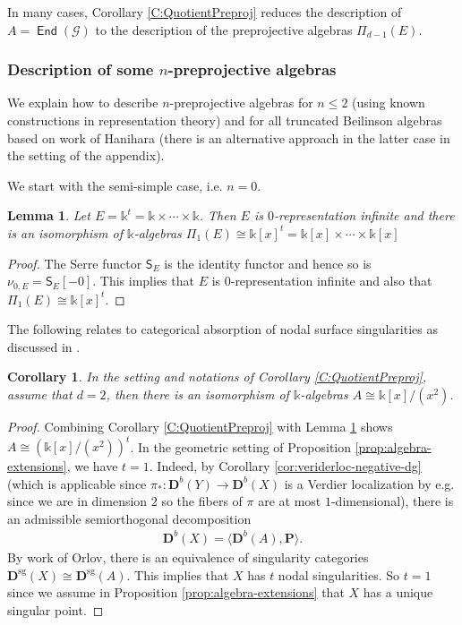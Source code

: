 \documentclass[a4paper,11pt, reqno]{amsart}
\def\DD{\mathbf D}
\def\PP{\mathbf P}
\def\sG{\mathscr{G}}
\newcommand{\opname}[1]{\operatorname{\mathsf{#1}}}
\newcommand{\End}{\opname{End}}
\def\Dsg{\DD^{\mathrm{sg}}}
\def\Db{\DD^b}
\theoremstyle{plain}
\newtheorem{lemma}[dummy]{Lemma}
\newtheorem{corollary}[dummy]{Corollary}
\theoremstyle{definition}
\numberwithin{equation}{section}
\begin{document}
In many cases, Corollary \ref{C:QuotientPreproj} reduces the description of $A=\End(\sG)$ to the description of the preprojective algebras $\Pi_{d-1}(E)$.

\subsubsection{Description of some $n$-preprojective algebras}

We explain how to describe $n$-preprojective algebras for $n\leq 2$ (using known constructions in representation theory) and for all truncated Beilinson algebras based on work of Hanihara \cite{Hanihara2} (there is an alternative approach in the latter case in the setting of the appendix).

We start with the semi-simple case, i.e. $n=0$.

\begin{lemma}\label{L:preprojn0}
    Let $E=\mathbb{k}^t=\mathbb{k} \times \cdots \times \mathbb{k}$. Then $E$ is $0$-representation infinite and there is an isomorphism of $\mathbb k$-algebras $\Pi_1(E) \cong \mathbb{k}[x]^t = \mathbb{k}[x] \times \cdots \times \mathbb{k}[x]$
    
\end{lemma}
\begin{proof}
    The Serre functor $\mathsf{S}_E$ is the identity functor and hence so is $\nu_{0,E}=\mathsf{S}_E[-0]$. This implies that $E$ is $0$-representation infinite and also that $\Pi_1(E) \cong \mathbb{k}[x]^t$.
\end{proof}

The following relates to categorical absorption of nodal surface singularities as discussed in \cite{kks, ks}.

\begin{corollary}\label{cor:nodal-2d}
    In the setting and notations of Corollary \ref{C:QuotientPreproj}, assume that $d=2$, then there is an isomorphism of $\mathbb{k}$-algebras $A \cong \mathbb{k}[x]/(x^2)$.
\end{corollary}
\begin{proof}
   Combining Corollary \ref{C:QuotientPreproj} with Lemma \ref{L:preprojn0} shows $A \cong (\mathbb{k}[x]/(x^2))^t$. In the geometric setting of Proposition \ref{prop:algebra-extensions}, we have $t=1$. Indeed, by Corollary \ref{cor:veriderloc-negative-dg} (which is applicable since $\pi_*\colon \Db(Y) \to \Db(X)$ is a Verdier localization by e.g. \cite[Lemma 2.32]{pavic-shinder} since we are in dimension $2$ so the fibers of $\pi$ are at most $1$-dimensional), there is an admissible semiorthogonal decomposition
   \begin{align}
       \Db(X)=\langle \Db(A), \PP \rangle.
   \end{align}
   By work of Orlov, there is an equivalence of singularity categories $\Dsg(X)\cong \Dsg(A)$. This implies that $X$ has $t$ nodal singularities. So $t=1$ since we assume in Proposition \ref{prop:algebra-extensions} that $X$ has a unique singular point.
\end{proof}
\end{document}
